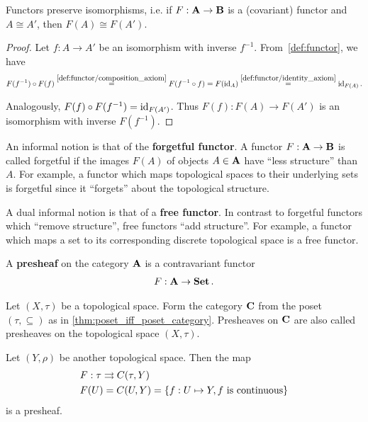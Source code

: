 \begin{proposition}\label{thm:functors_preserve_isomorphisms}\cite[exercise 1.2.21]{Leinster2014}
  Functors preserve isomorphisms, i.e. if \( F: \operatorname{\mathbf{A}} \to \operatorname{\mathbf{B}} \) is a (covariant) functor and \( A \cong A' \), then \( F(A) \cong F(A') \).
\end{proposition}
\begin{proof}
  Let \( f: A \to A' \) be an isomorphism with inverse \( f^{-1} \). From~\cref{def:functor}, we have
  \begin{align*}
    F(f^{-1}) \circ F(f)
    \overset{\ref{def:functor/composition_axiom}} =
    F(f^{-1} \circ f)
    =
    F(\operatorname{id}_A)
    \overset{\ref{def:functor/identity_axiom}} =
    \operatorname{id}_{F(A)}.
  \end{align*}

  Analogously, \( F(f) \circ F(f^{-1}) = \operatorname{id}_{F(A')} \). Thus \( F(f): F(A) \to F(A') \) is an isomorphism with inverse \( F(f^{-1}) \).
\end{proof}

\begin{note}\label{note:forgetful_free_functor}\cite[examples 1.2.3, 1.2.4]{Leinster2014}
  An informal notion is that of the \textbf{forgetful functor}. A functor \( F: \operatorname{\mathbf{A}} \to \operatorname{\mathbf{B}} \) is called forgetful if the images \( F(A) \) of objects \( A \in \operatorname{\mathbf{A}} \) have \enquote{less structure} than \( A \). For example, a functor which maps topological spaces to their underlying sets is forgetful since it \enquote{forgets} about the topological structure.

  A dual informal notion is that of a \textbf{free functor}. In contrast to forgetful functors which \enquote{remove structure}, free functors \enquote{add structure}. For example, a functor which maps a set to its corresponding discrete topological space is a free functor.
\end{note}

\begin{definition}\label{def:presheaf}\cite[definition 1.2.15]{Leinster2014}
  A \textbf{presheaf} on the category \( \operatorname{\mathbf{A}} \) is a contravariant functor
  \begin{align*}
    F: \operatorname{\mathbf{A}} \to \operatorname{\mathbf{Set}}.
  \end{align*}
\end{definition}

\begin{example}\label{ex:topological_space_presheaf}\cite[24]{Leinster2014}
  Let \( (X, \tau) \) be a topological space. Form the category \( \operatorname{\mathbf{C}} \) from the poset \( (\tau, \subseteq) \) as in \cref{thm:poset_iff_poset_category}. Presheaves on \( \operatorname{\mathbf{C}} \) are also called presheaves on the topological space \( (X, \tau) \).

  Let \( (Y, \rho) \) be another topological space. Then the map
  \begin{align*}
    &F: \tau \rightrightarrows C(\tau, Y) \\
    &F(U) = C(U, Y) = \{ f: U \mapsto Y, f \text{ is continuous} \}
  \end{align*}
  is a presheaf.
\end{example}

